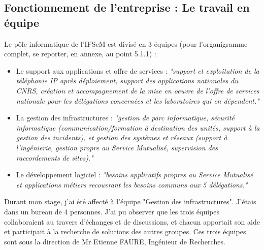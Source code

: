 \subsection{Fonctionnement de l'entreprise : Le travail en équipe}

Le pôle informatique de l'IFSeM est divisé en 3 équipes (pour l'organigramme complet, se reporter, en annexe, au point 5.1.1) : 
\begin{itemize}
    \item Le support aux applications et offre de services : \textit{"support et exploitation de la téléphonie IP après déploiement, support des applications nationales du CNRS, création et accompagnement de la mise en oeuvre de l’offre de services nationale pour les délégations concernées et les laboratoires qui en dépendent.\footnotemark[3]"}
    \item La gestion des infrastructures : \textit{"gestion de parc informatique, sécurité informatique (communication/formation à destination des unités, support à la gestion des incidents), et gestion des systèmes et réseaux (support à l’ingénierie, gestion propre au Service Mutualisé, supervision des raccordements de sites).\footnotemark[3]"}
    \item Le développement logiciel : \textit{"besoins applicatifs propres au Service Mutualisé et applications métiers recouvrant les besoins communs aux 5 délégations.\footnotemark[3]"}
\end{itemize}
\smallbreak
Durant mon stage, j'ai été affecté à l'équipe "Gestion des infrastructures". J'étais dans un bureau de 4 personnes. J'ai pu observer que les trois équipes collaboraient au travers d'échanges et de discussions, et chacun apportait son aide et participait à la recherche de solutions des autres groupes. 
Ces trois équipes sont sous la direction de Mr Etienne FAURE, Ingénieur de Recherches.

